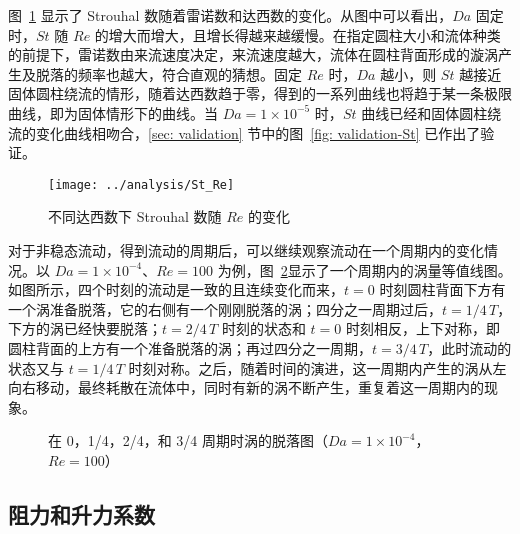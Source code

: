 图~\ref{fig: St} 显示了 Strouhal 数随着雷诺数和达西数的变化。从图中可以看出，$Da$ 固定时，$St$ 随 $Re$ 的增大而增大，且增长得越来越缓慢。在指定圆柱大小和流体种类的前提下，雷诺数由来流速度决定，来流速度越大，流体在圆柱背面形成的漩涡产生及脱落的频率也越大，符合直观的猜想。固定 $Re$ 时，$Da$ 越小，则 $St$ 越接近固体圆柱绕流的情形，随着达西数趋于零，得到的一系列曲线也将趋于某一条极限曲线，即为固体情形下的曲线。当 $Da=1 \times 10^{-5}$ 时，$St$ 曲线已经和固体圆柱绕流的变化曲线相吻合，\ref{sec: validation} 节中的图~\ref{fig: validation-St} 已作出了验证。

\begin{figure}
	\centering
	\texttt{[image: ../analysis/St\_Re]}
	\caption{不同达西数下 Strouhal 数随 $Re$ 的变化}
	\label{fig: St}
\end{figure}

对于非稳态流动，得到流动的周期后，可以继续观察流动在一个周期内的变化情况。以 $Da=1\times 10^{-4}$、$Re=100$ 为例，图~\ref{fig: 4*vortex}显示了一个周期内的涡量等值线图。如图所示，四个时刻的流动是一致的且连续变化而来，$t=0$ 时刻圆柱背面下方有一个涡准备脱落，它的右侧有一个刚刚脱落的涡；四分之一周期过后，$t=1/4\,T$，下方的涡已经快要脱落；$t=2/4\,T$ 时刻的状态和 $t=0$ 时刻相反，上下对称，即圆柱背面的上方有一个准备脱落的涡；再过四分之一周期，$t=3/4\,T$，此时流动的状态又与 $t=1/4\,T$ 时刻对称。之后，随着时间的演进，这一周期内产生的涡从左向右移动，最终耗散在流体中，同时有新的涡不断产生，重复着这一周期内的现象。

\begin{figure}
	\centering
	\begin{minipage}{\textwidth}
		\centering
	\end{minipage}
	\centering
	\begin{minipage}{\textwidth}
		\centering
	\end{minipage}
	\caption{在 0，1/4，2/4，和 3/4 周期时涡的脱落图（$Da=1\times 10^{-4}$，$Re=100$）}
	\label{fig: 4*vortex}
\end{figure}

\subsection{阻力和升力系数}

